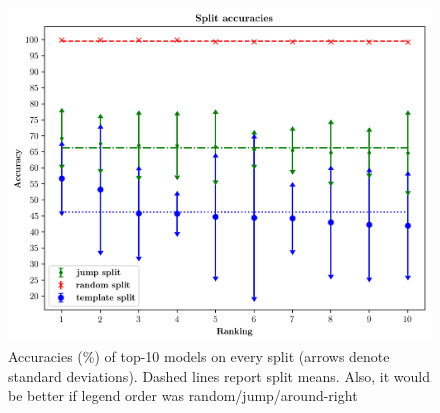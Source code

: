 
\begin{figure}[h]
    \includegraphics[width=.5\textwidth,keepaspectratio]{figures/accuracies_all_splits.png}
    \centering
    \caption{Accuracies (\%) of top-10 models on every split (arrows
      denote standard deviations). Dashed lines report split
      means.  Also, it would be better if
      legend order was random/jump/around-right}
    \label{fig:exp1}
\end{figure}


